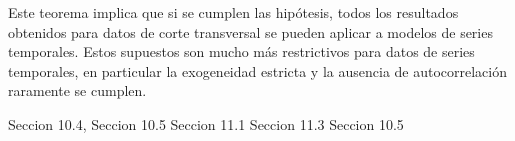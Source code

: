 Este teorema implica que si se cumplen las hip\'otesis, todos los resultados obtenidos para datos de corte transversal se pueden aplicar a modelos de series temporales. Estos supuestos son mucho m\'as restrictivos para datos de series temporales, en particular la exogeneidad estricta y la ausencia de autocorrelaci\'on raramente se cumplen.



Seccion 10.4, 
Seccion 10.5
Seccion 11.1
Seccion 11.3
Seccion 10.5